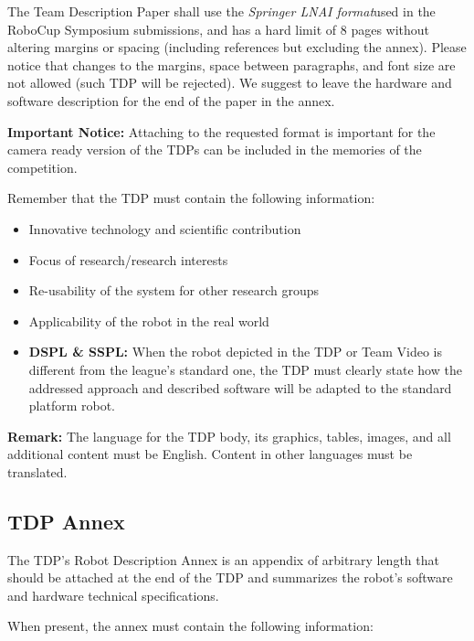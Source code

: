 \documentclass[runningheads,a4paper]{llncs}
\begin{document}
The Team Description Paper shall use the \textit{Springer LNAI format}\footnotemark used in the RoboCup Symposium submissions, and has a hard limit of 8 pages without altering margins or spacing (including references but excluding the annex). Please notice that changes to the margins, space between paragraphs, and font size are not allowed (such TDP will be rejected). We suggest to leave the hardware and software description for the end of the paper in the annex.

\textbf{Important Notice:} Attaching to the requested format is important for the camera ready version of the TDPs can be included in the memories of the competition.

Remember that the TDP must contain the following information:

\begin{itemize}
	\item Innovative technology and scientific contribution
	\item Focus of research/research interests
	\item Re-usability of the system for other research groups
	\item Applicability of the robot in the real world
	\item \textbf{DSPL \& SSPL:} When the robot depicted in the TDP or Team Video is different from the league's standard one, the TDP must clearly state how the addressed approach and described software will be adapted to the standard platform robot.
\end{itemize}

\textbf{Remark:} The language for the TDP body, its graphics, tables, images, and all additional content must be English. Content in other languages must be translated.

\subsection{TDP Annex}
The TDP's Robot Description Annex is an appendix of arbitrary length that should be attached at the end of the TDP and summarizes the robot's software and hardware technical specifications.

When present, the annex must contain the following information:
\end{document}
